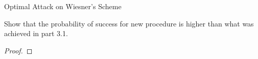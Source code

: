 \begin{solution}{Optimal Attack on Wiesner’s Scheme}\label{ques:x}
    \begin{question}
    Show that the probability of success for new procedure is higher than what was achieved
in part 3.1.
    \end{question}
    \tcblower{}
    \begin{proof}
    
    \end{proof}
\end{solution}
 